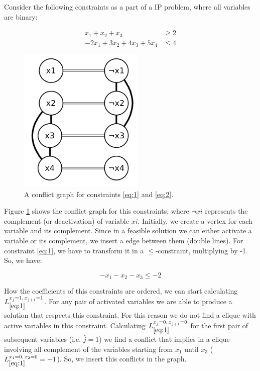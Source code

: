 \documentclass{endm}
\begin{document}
\begin{example}

Consider the following constraints as a part of a IP problem, where all variables are binary:

\begin{align}
x_1 + x_2 + x_3  & \geq 2\label{eq:1}\\
- 2x_1 + 3x_2 + 4x_3 + 5x_4 & \leq 4\label{eq:2}
\end{align}

\begin{figure}[!ht]
  \begin{center}
    \includegraphics[width=6cm]{graph.png}
  \end{center}
  \caption{A conflict graph for constraints \ref{eq:1} and \ref{eq:2}.}
  \label{graph}
\end{figure}

Figure \ref{graph} shows the conflict graph for this constraints, where $\neg xi$ represents the complement (or deactivation) of variable $xi$. Initially, we create a vertex for each variable and its complement. Since in a feasible solution we can either activate a variable or its complement, we insert a edge between them (double lines). For constraint \ref{eq:1}, we have to transform it in a $\leq$-constraint, multiplying by -1. So, we have:

\[ - x_1 - x_2 - x_3 \leq - 2 \]

How the coefficients of this constraints are ordered, we can start calculating $L_{\ref{eq:1}}^{x_{\hat{j}}=1,\, x_{\hat{j}+1}=1}$. For any pair of activated variables we are able to produce a solution that respects this constraint. For this reason we do not find a clique with active variables in this constraint. Calculating $L_{\ref{eq:1}}^{x_{\hat{j}}=0,\, x_{\hat{j}+1}=0}$ for the first pair of subsequent variables (i.e. $\hat{j}=1$) we find a conflict that implies in a clique involving all complement of the variables starting from $x_1$ until $x_3$ ($L_{\ref{eq:1}}^{x_1=0,\, x_2=0} = -1$). So, we insert this conflicts in the graph.


\end{example}
\end{document}

